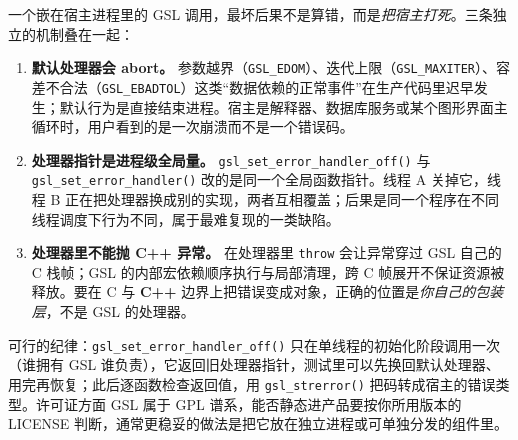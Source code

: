 \documentclass[12pt,a4paper,fontset=fandol]{ctexbook}
\newcommand{\Fn}[1]{\texttt{#1()}}
\newcommand{\Tp}[1]{\texttt{#1}}
\newcommand{\Bk}{\allowbreak}
\newcommand{\Lang}[1]{\textsf{\bfseries #1}}
\newcommand{\CPP}{\Lang{C++}}
\begin{document}
\begin{warning}[title={默认错误处理器会把宿主打死}]
一个嵌在宿主进程里的 GSL 调用，最坏后果不是算错，而是\emph{把宿主打死}。三条独立的机制叠在一起：
\begin{enumerate}
\item \textbf{默认处理器会 abort。} 参数越界（\Tp{GSL\_EDOM}）、迭代上限（\Tp{GSL\_MAXITER}）、容差不合法（\Tp{GSL\_EBADTOL}）这类``数据依赖的正常事件''在生产代码里迟早发生；默认行为是直接结束进程。宿主是解释器、数据库服务或某个图形界面主循环时，用户看到的是一次崩溃而不是一个错误码。
\item \textbf{处理器指针是进程级全局量。} \Fn{gsl\_set\Bk\_error\Bk\_handler\Bk\_off} 与 \Fn{gsl\_set\Bk\_error\Bk\_handler} 改的是同一个全局函数指针。线程 A 关掉它，线程 B 正在把处理器换成别的实现，两者互相覆盖；后果是同一个程序在不同线程调度下行为不同，属于最难复现的一类缺陷。
\item \textbf{处理器里不能抛 \CPP{} 异常。} 在处理器里 \Tp{throw} 会让异常穿过 GSL 自己的 C 栈帧；GSL 的内部宏依赖顺序执行与局部清理，跨 C 帧展开不保证资源被释放。要在 C 与 \CPP{} 边界上把错误变成对象，正确的位置是\emph{你自己的包装层}，不是 GSL 的处理器。
\end{enumerate}
可行的纪律：\Fn{gsl\_set\Bk\_error\Bk\_handler\Bk\_off} 只在单线程的初始化阶段调用一次（谁拥有 GSL 谁负责），它返回旧处理器指针，测试里可以先换回默认处理器、用完再恢复；此后逐函数检查返回值，用 \Fn{gsl\_strerror} 把码转成宿主的错误类型。许可证方面 GSL 属于 GPL 谱系，能否静态进产品要按你所用版本的 LICENSE 判断，通常更稳妥的做法是把它放在独立进程或可单独分发的组件里。
\end{warning}
\end{document}
